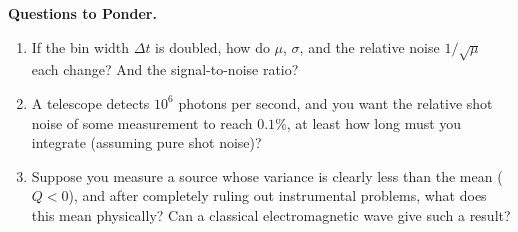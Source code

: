\medskip
\noindent\textbf{Questions to Ponder.}
\begin{enumerate}
  \item If the bin width $\Delta t$ is doubled, how do $\mu$, $\sigma$, and the relative noise $1/\sqrt{\mu}$ each change? And the signal-to-noise ratio?
  \item A telescope detects $10^6$ photons per second, and you want the relative shot noise of some measurement to reach $0.1\%$, at least how long must you integrate (assuming pure shot noise)?
  \item Suppose you measure a source whose variance is clearly less than the mean ($Q<0$), and after completely ruling out instrumental problems, what does this mean physically? Can a classical electromagnetic wave give such a result?
\end{enumerate}
